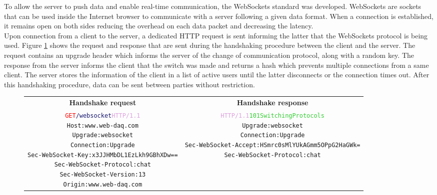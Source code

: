       To allow the server to push data and enable real-time communication, the WebSockets standard was developed. WebSockets are sockets that can be used inside the Internet browser to communicate with a server following a given data format. When a connection is established, it remains open on both sides reducing the overhead on each data packet and decreasing the latency. \\

      Upon connection from a client to the server, a dedicated HTTP request is sent informing the latter that the WebSockets protocol is being used. Figure \ref{fig:III-2-websocket} shows the request and response that are sent during the handshaking procedure between the client and the server. The request contains an upgrade header which informs the server of the change of communication protocol, along with a random key. The response from the server informs the client that the switch was made and returns a hash which prevents multiple connections from a same client. The server stores the information of the client in a list of active users until the latter disconnects or the connection times out. After this handshaking procedure, data can be sent between parties without restriction.

      \begin{figure}[h!]
        \begin{tabularx}{\textwidth}{C{1}C{1}}
          \textbf{Handshake  request} & \textbf{Handshake response} \\
        { \footnotesize
\begin{alltt}
\textcolor{Red}{GET} \textcolor{MidnightBlue}{/websocket} \textcolor{Plum}{HTTP/1.1} \newline
\textcolor{BurntOrange}{Host:} www.web-daq.com \newline
\textcolor{BurntOrange}{Upgrade:} websocket \newline
\textcolor{BurntOrange}{Connection:} Upgrade \newline
\textcolor{BurntOrange}{Sec-WebSocket-Key:} x3JJHMbDL1EzLkh9GBhXDw== \newline
\textcolor{BurntOrange}{Sec-WebSocket-Protocol:} chat \newline
\textcolor{BurntOrange}{Sec-WebSocket-Version:} 13 \newline
\textcolor{BurntOrange}{Origin:} www.web-daq.com
\end{alltt} } & { \footnotesize
\begin{alltt}
\textcolor{Plum}{HTTP/1.1} \textcolor{LimeGreen}{101 Switching Protocols} \newline
\textcolor{BurntOrange}{Upgrade:} websocket \newline
\textcolor{BurntOrange}{Connection:} Upgrade \newline
\textcolor{BurntOrange}{Sec-WebSocket-Accept:} HSmrc0sMlYUkAGmm5OPpG2HaGWk= \newline
\textcolor{BurntOrange}{Sec-WebSocket-Protocol:} chat
\end{alltt} }
        \end{tabularx}
        \caption{}
        \label{fig:III-2-websocket}
      \end{figure}

